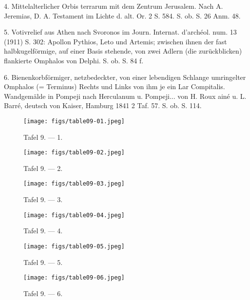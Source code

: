 \documentclass[a4paper, 11pt, oneside]{article}
\begin{document}
4. Mittelalterlicher Orbis terrarum mit dem Zentrum Jerusalem. Nach A. Jeremias, D. A. Testament im Lichte d. alt. Or. 2 S. 584. S. ob. S. 26 Anm. 48.

5. Votivrelief aus Athen nach Svoronos im Journ. Internat. d'archéol. num. 13 (1911) S. 302: Apollon Pythios, Leto und Artemis; zwischen ihnen der fast halbkugelförmige, auf einer Basis stehende, von zwei Adlern (die zurückblicken) flankierte Omphalos von Delphi. S. ob. S. 84 f.

6. Bienenkorbförmiger, netzbedeckter, von einer lebendigen Schlange umringelter Omphalos (= Terminus) Rechts und Links von ihm je ein Lar Compitalis. Wandgemälde in Pompeji nach Herculanum u. Pompeji... von H. Roux ainé u. L. Barré, deutsch von Kaiser, Hamburg 1841 2 Taf. 57. S. ob. S. 114.
\clearpage
\vspace*{\fill}
\begin{figure}[H]
\centering
\texttt{[image: figs/table09-01.jpeg]}
\caption{Tafel 9. --- 1.}
\end{figure}
\vspace*{\fill}
\clearpage
\vspace*{\fill}
\begin{figure}[H]
\centering
\texttt{[image: figs/table09-02.jpeg]}
\caption{Tafel 9. --- 2.}
\end{figure}
\vspace*{\fill}
\clearpage
\vspace*{\fill}
\begin{figure}[H]
\centering
\texttt{[image: figs/table09-03.jpeg]}
\caption{Tafel 9. --- 3.}
\end{figure}
\vspace*{\fill}
\clearpage
\vspace*{\fill}
\begin{figure}[H]
\centering
\texttt{[image: figs/table09-04.jpeg]}
\caption{Tafel 9. --- 4.}
\end{figure}
\vspace*{\fill}
\clearpage
\vspace*{\fill}
\begin{figure}[H]
\centering
\texttt{[image: figs/table09-05.jpeg]}
\caption{Tafel 9. --- 5.}
\end{figure}
\vspace*{\fill}
\clearpage
\vspace*{\fill}
\begin{figure}[H]
\centering
\texttt{[image: figs/table09-06.jpeg]}
\caption{Tafel 9. --- 6.}
\end{figure}
\vspace*{\fill}
\clearpage
\end{document}
